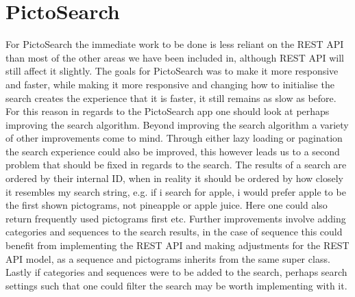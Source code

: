 \section{PictoSearch}
For PictoSearch the immediate work to be done is less reliant on the REST API than most of the other areas we have been included in, although REST API will still affect it slightly.
The goals for PictoSearch was to make it more responsive and faster, while making it more responsive and changing how to initialise the search creates the experience that it is faster, it still remains as slow as before.
For this reason in regards to the PictoSearch app one should look at perhaps improving the search algorithm.
Beyond improving the search algorithm a variety of other improvements come to mind.
Through either lazy loading or pagination the search experience could also be improved, this however leads us to a second problem that should be fixed in regards to the search.
The results of a search are ordered by their internal ID, when in reality it should be ordered by how closely it resembles my search string, e.g. if i search for apple, i would prefer apple to be the first shown pictograms, not pineapple or apple juice.
Here one could also return frequently used pictograms first etc.
Further improvements involve adding categories and sequences to the search results, in the case of sequence this could benefit from implementing the REST API and making adjustments for the REST API model, as a sequence and pictograms inherits from the same super class.
Lastly if categories and sequences were to be added to the search, perhaps search settings such that one could filter the search may be worth implementing with it.


